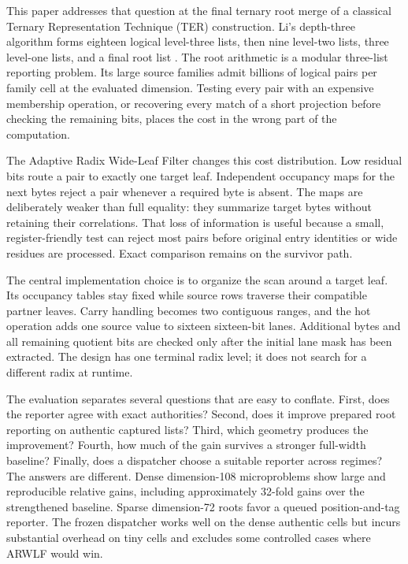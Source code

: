 \documentclass[manuscript,screen,review]{acmart}
\begin{document}
This paper addresses that question at the final ternary root merge of a classical Ternary Representation Technique (TER) construction. Li's depth-three algorithm forms eighteen logical level-three lists, then nine level-two lists, three level-one lists, and a final root list \cite{li2025}. The root arithmetic is a modular three-list reporting problem. Its large source families admit billions of logical pairs per family cell at the evaluated dimension. Testing every pair with an expensive membership operation, or recovering every match of a short projection before checking the remaining bits, places the cost in the wrong part of the computation.

The Adaptive Radix Wide-Leaf Filter changes this cost distribution. Low residual bits route a pair to exactly one target leaf. Independent occupancy maps for the next bytes reject a pair whenever a required byte is absent. The maps are deliberately weaker than full equality: they summarize target bytes without retaining their correlations. That loss of information is useful because a small, register-friendly test can reject most pairs before original entry identities or wide residues are processed. Exact comparison remains on the survivor path.

The central implementation choice is to organize the scan around a target leaf. Its occupancy tables stay fixed while source rows traverse their compatible partner leaves. Carry handling becomes two contiguous ranges, and the hot operation adds one source value to sixteen sixteen-bit lanes. Additional bytes and all remaining quotient bits are checked only after the initial lane mask has been extracted. The design has one terminal radix level; it does not search for a different radix at runtime.

The evaluation separates several questions that are easy to conflate. First, does the reporter agree with exact authorities? Second, does it improve prepared root reporting on authentic captured lists? Third, which geometry produces the improvement? Fourth, how much of the gain survives a stronger full-width baseline? Finally, does a dispatcher choose a suitable reporter across regimes? The answers are different. Dense dimension-108 microproblems show large and reproducible relative gains, including approximately 32-fold gains over the strengthened baseline. Sparse dimension-72 roots favor a queued position-and-tag reporter. The frozen dispatcher works well on the dense authentic cells but incurs substantial overhead on tiny cells and excludes some controlled cases where ARWLF would win.
\end{document}
